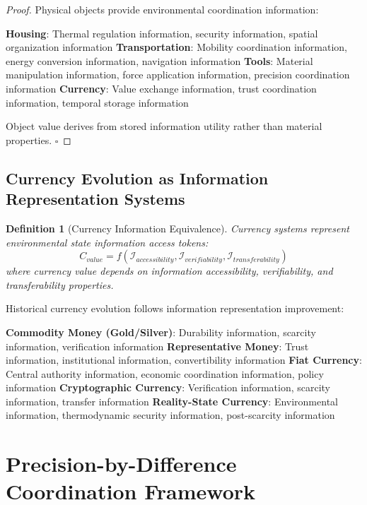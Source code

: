\documentclass[12pt,a4paper]{article}
\newtheorem{definition}[theorem]{Definition}
\begin{document}
\begin{proof}
Physical objects provide environmental coordination information:

\textbf{Housing}: Thermal regulation information, security information, spatial organization information
\textbf{Transportation}: Mobility coordination information, energy conversion information, navigation information  
\textbf{Tools}: Material manipulation information, force application information, precision coordination information
\textbf{Currency}: Value exchange information, trust coordination information, temporal storage information

Object value derives from stored information utility rather than material properties. $\square$
\end{proof}

\subsection{Currency Evolution as Information Representation Systems}

\begin{definition}[Currency Information Equivalence]
Currency systems represent environmental state information access tokens:
\begin{equation}
C_{value} = f(\mathcal{I}_{accessibility}, \mathcal{I}_{verifiability}, \mathcal{I}_{transferability})
\end{equation}
where currency value depends on information accessibility, verifiability, and transferability properties.
\end{definition}

Historical currency evolution follows information representation improvement:

\textbf{Commodity Money (Gold/Silver)}: Durability information, scarcity information, verification information
\textbf{Representative Money}: Trust information, institutional information, convertibility information
\textbf{Fiat Currency}: Central authority information, economic coordination information, policy information
\textbf{Cryptographic Currency}: Verification information, scarcity information, transfer information
\textbf{Reality-State Currency}: Environmental information, thermodynamic security information, post-scarcity information

\section{Precision-by-Difference Coordination Framework}
\end{document}
